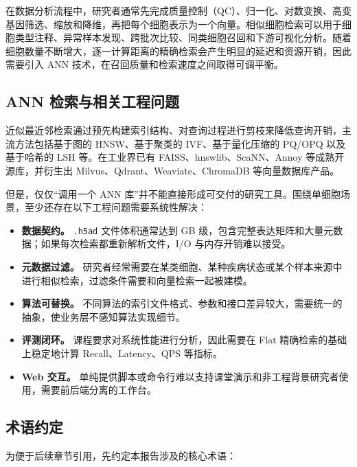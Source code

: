\documentclass[UTF8,a4paper,12pt]{ctexrep}
\begin{document}
在数据分析流程中，研究者通常先完成质量控制（QC）、归一化、对数变换、高变基因筛选、缩放和降维，再把每个细胞表示为一个向量。相似细胞检索可以用于细胞类型注释、异常样本发现、跨批次比较、同类细胞召回和下游可视化分析。随着细胞数量不断增大，逐一计算距离的精确检索会产生明显的延迟和资源开销，因此需要引入 ANN 技术，在召回质量和检索速度之间取得可调平衡。

\subsection{ANN 检索与相关工程问题}

近似最近邻检索通过预先构建索引结构、对查询过程进行剪枝来降低查询开销，主流方法包括基于图的 HNSW、基于聚类的 IVF、基于量化压缩的 PQ/OPQ 以及基于哈希的 LSH 等。在工业界已有 FAISS、hnswlib、ScaNN、Annoy 等成熟开源库，并衍生出 Milvus、Qdrant、Weaviate、ChromaDB 等向量数据库产品。

但是，仅仅``调用一个 ANN 库''并不能直接形成可交付的研究工具。围绕单细胞场景，至少还存在以下工程问题需要系统性解决：

\begin{itemize}
  \item \textbf{数据契约。} \texttt{.h5ad} 文件体积通常达到 GB 级，包含完整表达矩阵和大量元数据；如果每次检索都重新解析文件，I/O 与内存开销难以接受。
  \item \textbf{元数据过滤。} 研究者经常需要在某类细胞、某种疾病状态或某个样本来源中进行相似检索，过滤条件需要和向量检索一起被建模。
  \item \textbf{算法可替换。} 不同算法的索引文件格式、参数和接口差异较大，需要统一的抽象，使业务层不感知算法实现细节。
  \item \textbf{评测闭环。} 课程要求对系统性能进行分析，因此需要在 Flat 精确检索的基础上稳定地计算 Recall、Latency、QPS 等指标。
  \item \textbf{Web 交互。} 单纯提供脚本或命令行难以支持课堂演示和非工程背景研究者使用，需要前后端分离的工作台。
\end{itemize}

\subsection{术语约定}

为便于后续章节引用，先约定本报告涉及的核心术语：
\end{document}
